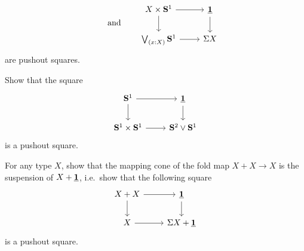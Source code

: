 \begin{exercises}
\begin{equation*}
\begin{tikzcd}
    \end{tikzcd}
    \qquad\text{and}\qquad
    \begin{tikzcd}
      X\times \sphere{1} \arrow[d] \arrow[r] & \unit \arrow[d] \\
      \bigvee_{(x:X)}\sphere{1} \arrow[r] & \susp{X}
    \end{tikzcd}
  \end{equation*}
  are pushout squares.
\item Show that the square
  \begin{equation*}
    \begin{tikzcd}
      \sphere{1} \arrow[r] \arrow[d] & \unit \arrow[d] \\
      \sphere{1}\times\sphere{1} \arrow[r] & \sphere{2}\vee\sphere{1}
    \end{tikzcd}
  \end{equation*}
  is a pushout square.
\item For any type $X$, show that the mapping cone of the fold map $X+X\to X$ is the suspension of $X+\underline{\mathbf{1}}$, i.e.~show that the following square
  \begin{equation*}
    \begin{tikzcd}
      X+X \arrow[d] \arrow[r] & \unit \arrow[d] \\
      X \arrow[r] & \susp{X+\unit}
    \end{tikzcd}
  \end{equation*}
  is a pushout square.
\end{exercises}
